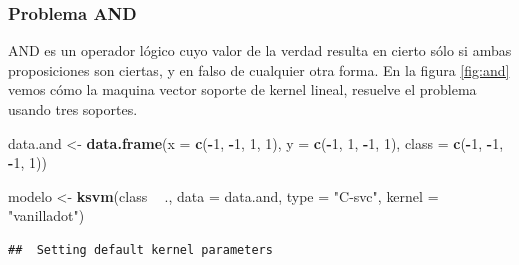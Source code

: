 \documentclass[12pt,spanish,a4paper]{article}
\newenvironment{Shaded}{\begin{snugshade}}{\end{snugshade}}
\newcommand{\KeywordTok}[1]{\textcolor[rgb]{0.13,0.29,0.53}{\textbf{#1}}}
\newcommand{\DataTypeTok}[1]{\textcolor[rgb]{0.13,0.29,0.53}{#1}}
\newcommand{\DecValTok}[1]{\textcolor[rgb]{0.00,0.00,0.81}{#1}}
\newcommand{\FloatTok}[1]{\textcolor[rgb]{0.00,0.00,0.81}{#1}}
\newcommand{\StringTok}[1]{\textcolor[rgb]{0.31,0.60,0.02}{#1}}
\newcommand{\CommentTok}[1]{\textcolor[rgb]{0.56,0.35,0.01}{\textit{#1}}}
\newcommand{\OperatorTok}[1]{\textcolor[rgb]{0.81,0.36,0.00}{\textbf{#1}}}
\newcommand{\NormalTok}[1]{#1}
\numberwithin{equation}{section}
\begin{document}
\subsubsection{Problema AND}\label{problema-and}

AND es un operador lógico cuyo valor de la verdad resulta en cierto sólo
si ambas proposiciones son ciertas, y en falso de cualquier otra forma.
En la figura \ref{fig:and} vemos cómo la maquina vector soporte de
kernel lineal, resuelve el problema usando tres soportes.

\begin{Shaded}
\begin{Highlighting}[]
\NormalTok{data.and <-}\StringTok{ }\KeywordTok{data.frame}\NormalTok{(}\DataTypeTok{x =} \KeywordTok{c}\NormalTok{(}\OperatorTok{-}\DecValTok{1}\NormalTok{, }\OperatorTok{-}\DecValTok{1}\NormalTok{, }\DecValTok{1}\NormalTok{, }\DecValTok{1}\NormalTok{), }
                   \DataTypeTok{y =} \KeywordTok{c}\NormalTok{(}\OperatorTok{-}\DecValTok{1}\NormalTok{, }\DecValTok{1}\NormalTok{, }\OperatorTok{-}\DecValTok{1}\NormalTok{, }\DecValTok{1}\NormalTok{),}
                   \DataTypeTok{class =} \KeywordTok{c}\NormalTok{(}\OperatorTok{-}\DecValTok{1}\NormalTok{, }\OperatorTok{-}\DecValTok{1}\NormalTok{, }\OperatorTok{-}\DecValTok{1}\NormalTok{, }\DecValTok{1}\NormalTok{))}

\NormalTok{modelo <-}\StringTok{ }\KeywordTok{ksvm}\NormalTok{(class }\OperatorTok{~}\StringTok{ }\NormalTok{., }
               \DataTypeTok{data =}\NormalTok{ data.and, }
               \DataTypeTok{type =} \StringTok{"C-svc"}\NormalTok{, }
               \DataTypeTok{kernel =} \StringTok{"vanilladot"}\NormalTok{)}
\end{Highlighting}
\end{Shaded}

\begin{verbatim}
##  Setting default kernel parameters
\end{verbatim}

\begin{Shaded}
\end{Shaded}
\end{document}
